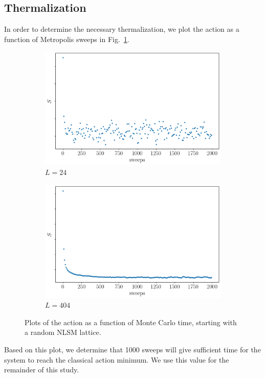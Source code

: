 \subsection{Thermalization}
\label{sec:thermalization}
In order to determine the necessary thermalization, we plot the action as a function of Metropolis sweeps in Fig.~\ref{fig:therm}.
\begin{figure}[h]
  \centering
      \begin{subfigure}[b]{0.5\textwidth}\centering
        \includegraphics[width=\textwidth]{imgs/therm24.png}
        \caption{$L=24$}
      \end{subfigure}%
      \hfill
      \begin{subfigure}[b]{0.5\textwidth}\centering
        \includegraphics[width=\textwidth]{imgs/therm404.png}
        \caption{$L=404$}
      \end{subfigure}
      \hfill
      \caption{\label{fig:therm} Plots of the action as a function of Monte Carlo time, starting with a random NLSM lattice.}
\end{figure}
Based on this plot, we determine that 1000 sweeps will give sufficient time for the system to reach the classical action minimum. We use this value for the remainder of this study.

